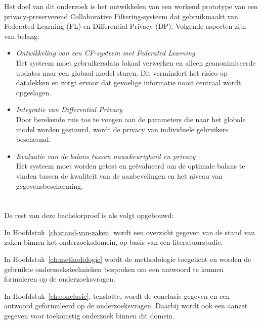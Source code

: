 Het doel van dit onderzoek is het ontwikkelen van een werkend prototype van een privacy-preserverend Collaborative Filtering-systeem dat gebruikmaakt van Federated Learning (FL) en Differential Privacy (DP). Volgende aspecten zijn van belang:
\begin{itemize}
  \item \textit{Ontwikkeling van een CF-systeem met Federated Learning}
  \\
  Het systeem moet gebruikersdata lokaal verwerken en alleen geanonimiseerde updates naar een globaal model sturen. Dit vermindert het risico op datalekken en zorgt ervoor dat gevoelige informatie nooit centraal wordt opgeslagen.
  \item \textit{Integratie van Differential Privacy}
  \\
  Door berekende ruis toe te voegen aan de parameters die naar het globale model worden gestuurd, wordt de privacy van individuele gebruikers beschermd.
  \item \textit{Evaluatie van de balans tussen nauwkeurigheid en privacy}
  \\
  Het systeem moet worden getest en geëvalueerd om de optimale balans te vinden tussen de kwaliteit van de aanbevelingen en het niveau van gegevensbescherming.
\end{itemize}

\section{}%
\label{sec:opzet-bachelorproef}


De rest van deze bachelorproef is als volgt opgebouwd:

In Hoofdstuk~\ref{ch:stand-van-zaken} wordt een overzicht gegeven van de stand van zaken binnen het onderzoeksdomein, op basis van een literatuurstudie.

In Hoofdstuk~\ref{ch:methodologie} wordt de methodologie toegelicht en worden de gebruikte onderzoekstechnieken besproken om een antwoord te kunnen formuleren op de onderzoeksvragen.


In Hoofdstuk~\ref{ch:conclusie}, tenslotte, wordt de conclusie gegeven en een antwoord geformuleerd op de onderzoeksvragen. Daarbij wordt ook een aanzet gegeven voor toekomstig onderzoek binnen dit domein.